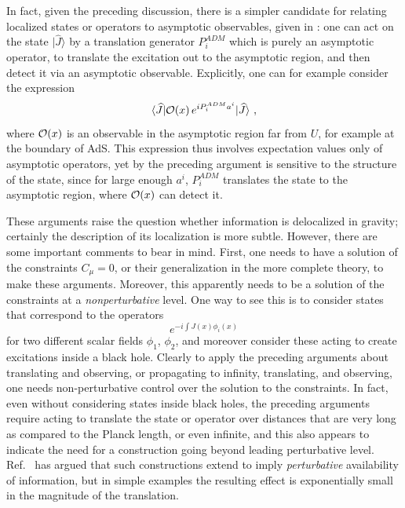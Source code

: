 \documentclass[11pt]{article}
\numberwithin{equation}{section}
\newcommand{\calo}{{\cal O}}
\newcommand{\beq}{\begin{equation}}
\newcommand{\eeq}{\end{equation}}
\begin{document}
In fact, given the preceding discussion, there is a simpler candidate for relating localized states or operators to asymptotic observables, given in \cite{DoGi3}:  one can act on the state $|\hat J\rangle$ by a translation generator $P_i^{ADM}$ which is purely an asymptotic operator, to translate the excitation out to the asymptotic region, and then detect it via an asymptotic observable.  Explicitly, one can for example consider the expression
\beq
\langle\widehat J|{\cal O}(x)\, e^{i P_i^{ADM} a^i} |\widehat J\rangle \ ,
\eeq
where $\calo(x)$ is an observable in the asymptotic region far from $U$, for example at the boundary of AdS.  This expression thus involves expectation values only of asymptotic operators, yet by the preceding argument is sensitive to the structure of the state, since for large enough $a^i$, $P_i^{ADM}$ translates the state to the asymptotic region, where $\calo(x)$ can detect it.

These arguments raise the question whether information is delocalized in gravity; certainly the description of its localization is more subtle.  However, there are some important comments to bear in mind.  First, one needs to have a solution of the constraints $C_\mu=0$, or their generalization in the more complete theory, to make these arguments.  Moreover, this apparently needs to be a solution of the constraints at a {\it nonperturbative} level.  One way to see this is to consider states that correspond to the operators
\beq
e^{-i\int J(x)\phi_i(x)}
\eeq
for two different scalar fields $\phi_1$, $\phi_2$, and moreover consider these acting to create excitations inside a black hole.  Clearly to apply the preceding arguments about translating and observing, or propagating to infinity, translating, and observing, one needs non-perturbative control over the solution to the constraints.  In fact, even without considering states inside black holes, the preceding arguments require acting to translate the state or operator over distances that are very long as compared to the Planck length, or even infinite, and this also appears to indicate the need for a construction going beyond leading perturbative level. Ref.~\cite{LPRS} has argued that  such constructions extend to imply {\it perturbative} availability of information, but in simple examples the resulting effect is exponentially small in the magnitude of the translation.
\end{document}
